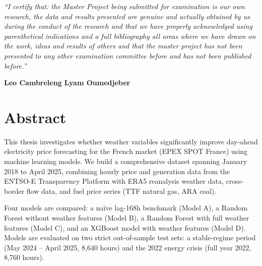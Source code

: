 \documentclass[12pt, a4paper, oneside]{report}
\begin{document}
\vspace{2cm}

\noindent\textit{``I certify that: the Master Project being submitted for examination is our own research, the data and results presented are genuine and actually obtained by us during the conduct of the research and that we have properly acknowledged using parenthetical indications and a full bibliography all areas where we have drawn on the work, ideas and results of others and that the master project has not been presented to any other examination committee before and has not been published before.''}

\vspace{2cm}
\noindent\textbf{Leo Cambreleng} \hfill \textbf{Lyam Oumedjeber}
\clearpage

\thispagestyle{empty}
\vspace*{0.5cm}
\noindent{}
\vspace{0.5cm}
\clearpage

\chapter*{Abstract}

This thesis investigates whether weather variables significantly improve
day-ahead electricity price forecasting for the French market (EPEX SPOT
France) using machine learning models. We build a comprehensive dataset
spanning January 2018 to April 2025, combining hourly price and generation
data from the ENTSO-E Transparency Platform with ERA5 reanalysis weather data,
cross-border flow data, and fuel price series (TTF natural gas, ARA coal).

Four models are compared: a na\"{i}ve lag-168h benchmark (Model A), a Random
Forest without weather features (Model B), a Random Forest with full weather
features (Model C), and an XGBoost model with weather features (Model D).
Models are evaluated on two strict out-of-sample test sets: a stable-regime
period (May 2024 -- April 2025, 8,640 hours) and the 2022 energy crisis
(full year 2022, 8,760 hours).
\end{document}
